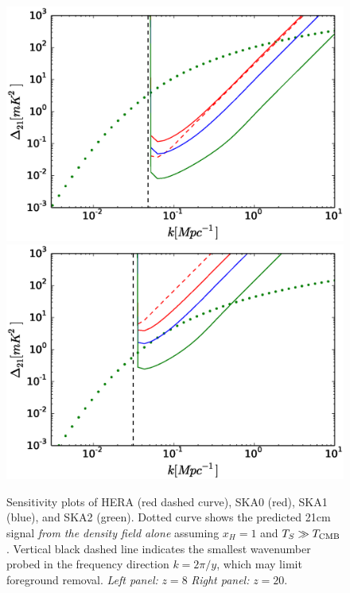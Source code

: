 \documentclass{PoS}
\begin{document}
\begin{figure}[htbp]
\begin{center}
\includegraphics[scale=0.35]{figures/sensitivityPlot_z8.eps}
\includegraphics[scale=0.35]{figures/sensitivityPlot_z20.eps}
\caption{Sensitivity plots of HERA (red dashed curve), SKA0 (red), SKA1 (blue), and SKA2 (green). Dotted curve shows the predicted 21cm signal {\em from the density field alone} assuming $x_H=1$ and $T_S\gg T_{\rm CMB}$. Vertical black dashed line indicates the smallest wavenumber probed in the frequency direction $k=2\pi/y$, which may limit foreground removal.  {\em Left panel:} $z=8$ {\em Right panel:} $z=20$.}
\label{fig:sensitivity}
\end{center}
\end{figure}
\end{document}
